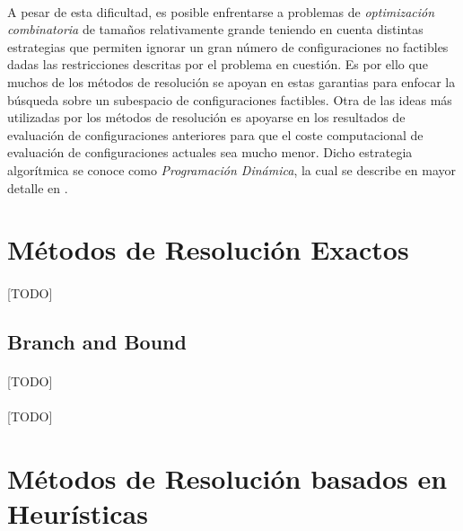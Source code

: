 \documentclass{subfiles}
\begin{document}
      \paragraph{}
      A pesar de esta dificultad, es posible enfrentarse a problemas de \emph{optimización combinatoria} de tamaños relativamente grande teniendo en cuenta distintas estrategias que permiten ignorar un gran número de configuraciones no factibles dadas las restricciones descritas por el problema en cuestión. Es por ello que muchos de los métodos de resolución se apoyan en estas garantias para enfocar la búsqueda sobre un subespacio de configuraciones factibles. Otra de las ideas más utilizadas por los métodos de resolución es apoyarse en los resultados de evaluación de configuraciones anteriores para que el coste computacional de evaluación de configuraciones actuales sea mucho menor. Dicho estrategia algorítmica se conoce como \emph{Programación Dinámica}, la cual se describe en mayor detalle en \cite{bellman1954theory}.


    \section{Métodos de Resolución Exactos}
    \label{sec:solving_exacts}

      \paragraph{}
      [TODO]

      \subsection{Branch and Bound}
      \label{sec:solving_branch_bound}

        \paragraph{}
        [TODO]

      \paragraph{}
      [TODO]

    \section{Métodos de Resolución basados en Heurísticas}
    \label{sec:solving_heuristics}
\end{document}
